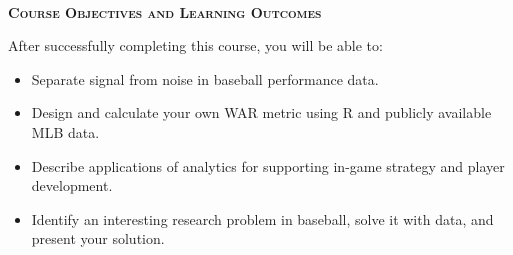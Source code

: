 \documentclass[11pt]{article}
\begin{document}
~\\
\textbf{\textsc{Course Objectives and Learning Outcomes}}
\begin{adjustwidth}{1cm}{0cm}
  After successfully completing this course, you will be able to:
  \begin{itemize}
    \item Separate signal from noise in baseball performance data.
    \item Design and calculate your own WAR metric using R and publicly available MLB data.
    \item Describe applications of analytics for supporting in-game strategy and player development.
    \item Identify an interesting research problem in baseball, solve it with data, and present your solution.
  \end{itemize}
\end{adjustwidth}
\end{document}
